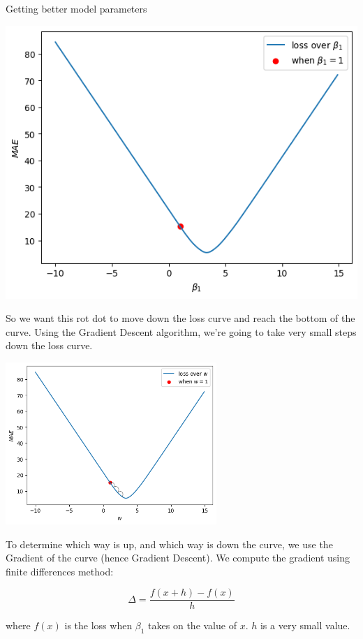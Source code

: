 \documentclass[10pt]{beamer}
\begin{document}
\begin{frame}[fragile,allowframebreaks,label=]{Getting better model parameters}
\begin{center}
\includegraphics[width=.9\linewidth]{images/loss_curve_w_1.png}
\end{center}

So we want this rot dot to move down the loss curve and reach the bottom of the
curve. Using the \alert{Gradient Descent} algorithm, we're going to take \alert{very small steps}
down the loss curve.

\begin{center}
\includegraphics[width=0.6\textwidth]{images/loss_curve_w_1_with_path.png}
\end{center}

To determine which way is up, and which way is down the curve, we use the \alert{Gradient} of
the curve (hence Gradient Descent). We compute the gradient using finite differences method:

\[
\Delta = \frac{f(x+h) - f(x)}{h}
\]

where \(f(x)\) is the loss when \(\beta_1\) takes on the value of \(x\). \(h\) is a very small
value.


\end{frame}
\end{document}
